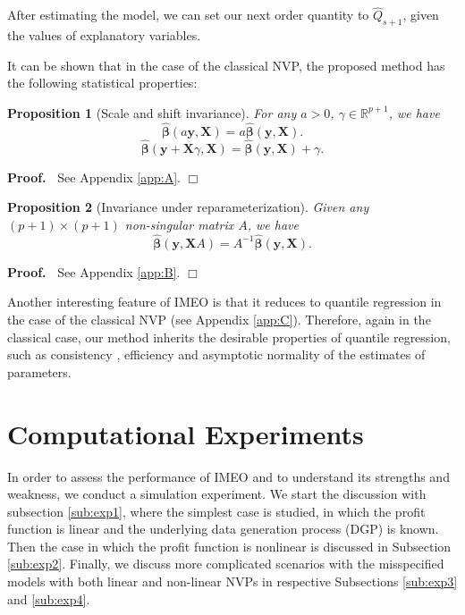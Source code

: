 \documentclass{article}
\newtheorem{proposition}{Proposition}
\newenvironment{proof}
 {\begin{trivlist} \item[] {\bf Proof.\ }}{\hfill$\Box$ \end{trivlist}}
\begin{document}
After estimating the model, we can set our next order quantity to $\hat{Q}_{s+1}$, given the values of explanatory variables.

It can be shown that in the case of the classical NVP, the proposed method has the following statistical properties:
\begin{proposition}[Scale and shift invariance]
For any $a>0$, $\gamma\in \mathbb{R}^{p+1}$, we have
\[
    \hat{\boldsymbol{\beta}}(a\mathbf{y},\mathbf{X})=a\hat{\boldsymbol{\beta}}(\mathbf{y},\mathbf{X}).
\]
\[
    \hat{\boldsymbol{\beta}}(\mathbf{y}+\mathbf{X}\gamma,\mathbf{X})=
    \hat{\boldsymbol{\beta}}(\mathbf{y},\mathbf{X})+\gamma.
\]
\end{proposition}
\begin{proof}
See Appendix \ref{app:A}.
\end{proof}

\begin{proposition}[Invariance under reparameterization]
Given any $(p+1)\times (p+1)$ non-singular matrix $A$, we have
\[
        \hat{\boldsymbol{\beta}}(\mathbf{y},\mathbf{X}A)=A^{-1}\hat{\boldsymbol{\beta}}(\mathbf{y},\mathbf{X}).
\]
\end{proposition}
\begin{proof}
See Appendix \ref{app:B}.
\end{proof}

Another interesting feature of IMEO is that it reduces to quantile regression in the case of the classical NVP (see Appendix \ref{app:C}). Therefore, again in the classical case, our method inherits the desirable properties of quantile regression, such as consistency \cite{Koe05}, efficiency \cite{KM99} and asymptotic normality \cite{KHM05} of the estimates of parameters.

\section{Computational Experiments} \label{se:results}

In order to assess the performance of IMEO and to understand its strengths and weakness, we conduct a simulation experiment. We start the discussion with subsection \ref{sub:exp1}, where the simplest case is studied, in which the profit function is linear and the underlying data generation process (DGP) is known. Then the case in which the profit function is nonlinear is discussed in Subsection \ref{sub:exp2}. Finally, we discuss more complicated scenarios with the misspecified models with both linear and non-linear NVPs in respective Subsections \ref{sub:exp3} and \ref{sub:exp4}.
\end{document}
